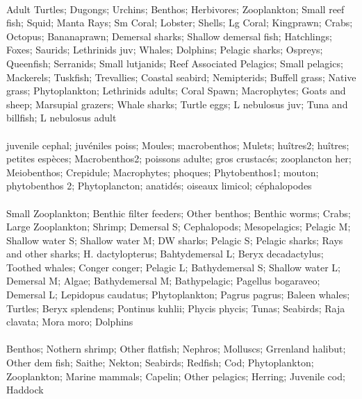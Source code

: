 \fullhline
\hline
{} \\
\hline
Adult Turtles; Dugongs; Urchins; Benthos; Herbivores; Zooplankton; Small reef fish; Squid; Manta Rays; Sm Coral; Lobster; Shells; Lg Coral; Kingprawn; Crabs; Octopus; Bananaprawn; Demersal sharks; Shallow demersal fish; Hatchlings; Foxes; Saurids; Lethrinids juv; Whales; Dolphins; Pelagic sharks; Ospreys; Queenfish; Serranids; Small lutjanids; Reef Associated Pelagics; Small pelagics; Mackerels; Tuskfish; Trevallies; Coastal seabird; Nemipterids; Buffell grass; Native grass; Phytoplankton; Lethrinids adults; Coral Spawn; Macrophytes; Goats and sheep; Marsupial grazers; Whale sharks; Turtle eggs; L nebulosus juv; Tuna and billfish; L nebulosus adult\\
\fullhline
\hline
{} \\
\hline
juvenile cephal; juvéniles poiss; Moules; macrobenthos; Mulets; huîtres2; huîtres; petites espèces; Macrobenthos2; poissons adulte; gros crustacés; zooplancton her; Meiobenthos; Crepidule; Macrophytes; phoques; Phytobenthos1; mouton; phytobenthos 2; Phytoplancton; anatidés; oiseaux limicol; céphalopodes\\
\fullhline
\hline
{} \\
\hline
Small Zooplankton; Benthic filter feeders; Other benthos; Benthic worms; Crabs; Large Zooplankton; Shrimp; Demersal S; Cephalopods; Mesopelagics; Pelagic M; Shallow water S; Shallow water M; DW sharks; Pelagic S; Pelagic sharks; Rays and other sharks; H. dactylopterus; Bahtydemersal L; Beryx decadactylus; Toothed whales; Conger conger; Pelagic L; Bathydemersal S; Shallow water L; Demersal M; Algae; Bathydemersal M; Bathypelagic; Pagellus bogaraveo; Demersal L; Lepidopus caudatus; Phytoplankton; Pagrus pagrus; Baleen whales; Turtles; Beryx splendens; Pontinus kuhlii; Phycis phycis; Tunas; Seabirds; Raja clavata; Mora moro; Dolphins\\
\fullhline
\hline
{} \\
\hline
Benthos; Nothern shrimp; Other flatfish; Nephros; Molluscs; Grrenland halibut; Other dem fish; Saithe; Nekton; Seabirds; Redfish; Cod; Phytoplankton; Zooplankton; Marine mammals; Capelin; Other pelagics; Herring; Juvenile cod; Haddock\\
\fullhline
\hline
{} \\
